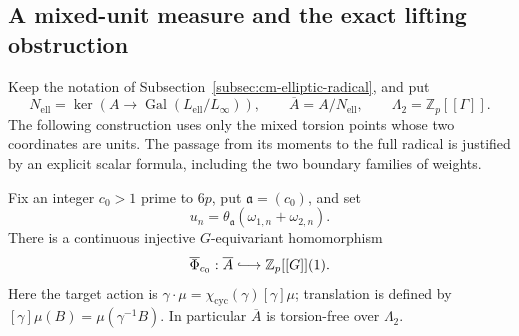 \subsection{A mixed-unit measure and the exact lifting obstruction}
\label{subsec:cm-nonabelian-gate}

Keep the notation of Subsection~\ref{subsec:cm-elliptic-radical}, and put
\[
 N_{\mathrm{ell}}=\ker\!\left(A\longrightarrow
                  \operatorname{Gal}(L_{\mathrm{ell}}/L_\infty)\right),
 \qquad \overline A=A/N_{\mathrm{ell}},\qquad
 \Lambda_2=\mathbb Z_p[[\Gamma]].
\]
The following construction uses only the mixed torsion points whose
two coordinates are units.  The passage from its moments to the
full radical is justified by an explicit scalar formula, including
the two boundary families of weights.

\begin{lemma}\label{lem:cm-mixed-measure-embedding}
Fix an integer \(c_0>1\) prime to \(6p\), put
\(\mathfrak a=(c_0)\), and set
\[
 u_n=\theta_{\mathfrak a}(\omega_{1,n}+\omega_{2,n}).
\]
There is a continuous injective \(G\)-equivariant homomorphism
\[
 \overline\Phi_{c_0}:\overline A
            \lhook\joinrel\longrightarrow \mathbb Z_p[[G]](1).
\]
Here the target action is
\(\gamma\cdot\mu=\chi_{\mathrm{cyc}}(\gamma)[\gamma]\mu\);
translation is defined by
\([\gamma]\mu(B)=\mu(\gamma^{-1}B)\).
In particular \(\overline A\) is torsion-free over \(\Lambda_2\).
\end{lemma}

